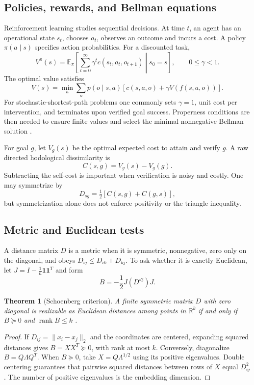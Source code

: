 \documentclass[11pt]{article}
\newtheorem{theorem}{Theorem}[section]
\theoremstyle{definition}
\theoremstyle{remark}
\newcommand{\rank}{\operatorname{rank}}
\newcommand{\R}{\mathbb R}
\begin{document}
\subsection{Policies, rewards, and Bellman equations}

Reinforcement learning studies sequential decisions. At time \(t\), an agent
has an operational state \(s_t\), chooses \(a_t\), observes an outcome and
incurs a cost. A policy \(\pi(a\mid s)\) specifies action probabilities. For a
discounted task,
\[
V^\pi(s)=\mathbb E_\pi\left[
\sum_{t=0}^\infty\gamma^t c(s_t,a_t,o_{t+1})
\middle|s_0=s\right],\qquad 0\le\gamma<1.
\]
The optimal value satisfies
\[
V(s)=\min_a\sum_o p(o\mid s,a)
\left[c(s,a,o)+\gamma V(f(s,a,o))\right].
\]
For stochastic-shortest-path problems one commonly sets \(\gamma=1\), unit
cost per intervention, and terminates upon verified goal success. Properness
conditions are then needed to ensure finite values and select the minimal
nonnegative Bellman solution \cite{Puterman1994,SuttonBarto2018}.

For goal \(g\), let \(V_g(s)\) be the optimal expected cost to attain and
verify \(g\). A raw directed hodological dissimilarity is
\[
C(s,g)=V_g(s)-V_g(g).
\]
Subtracting the self-cost is important when verification is noisy and costly.
One may symmetrize by
\[
D_{sg}=\tfrac12[C(s,g)+C(g,s)],
\]
but symmetrization alone does not enforce positivity or the triangle
inequality.

\subsection{Metric and Euclidean tests}

A distance matrix \(D\) is a metric when it is symmetric, nonnegative, zero
only on the diagonal, and obeys \(D_{ij}\le D_{ik}+D_{kj}\). To ask whether it
is exactly Euclidean, let \(J=I-\frac1n\mathbf1\mathbf1^T\) and form
\[
B=-\frac12J(D^{\circ2})J.
\]

\begin{theorem}[Schoenberg criterion]
\label{thm:schoenberg}
A finite symmetric matrix \(D\) with zero diagonal is realizable as Euclidean
distances among points in \(\R^k\) if and only if \(B\succeq0\) and
\(\rank B\le k\) \cite{Schoenberg1935}.
\end{theorem}
\begin{proof}
If \(D_{ij}=\|x_i-x_j\|_2\) and the coordinates are centered, expanding
squared distances gives \(B=XX^T\succeq0\), with rank at most \(k\).
Conversely, diagonalize \(B=Q\Lambda Q^T\). When \(B\succeq0\), take
\(X=Q\Lambda^{1/2}\) using its positive eigenvalues. Double centering
guarantees that pairwise squared distances between rows of \(X\) equal
\(D_{ij}^2\). The number of positive eigenvalues is the embedding dimension.
\end{proof}
\end{document}

